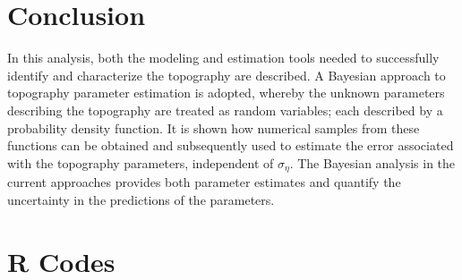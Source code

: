 \documentclass[12pt]{report}
\begin{document}
 
\chapter{Conclusion}
In this analysis, both the modeling and estimation tools needed to successfully identify and characterize the topography are described. A Bayesian approach to topography parameter estimation is adopted, whereby the unknown parameters describing the topography are treated as random variables; each described by a probability density function. It is shown how numerical samples from these functions can be obtained and subsequently used to estimate the error associated with the topography parameters, independent of $\sigma_{\eta}$. The Bayesian analysis in the current approaches provides both parameter estimates and quantify the uncertainty in the predictions of the parameters.
\appendix


\chapter{\label{app:1} R Codes}






\end{document}
